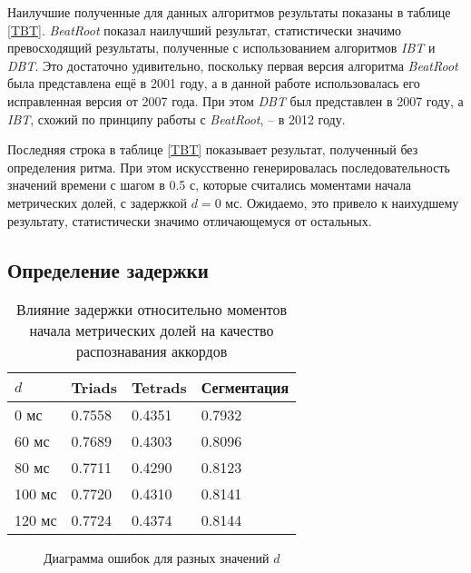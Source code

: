 Наилучшие полученные для данных алгоритмов результаты показаны в таблице
\ref{TBT}. \emph{BeatRoot} показал наилучший результат, статистически значимо
превосходящий результаты, полученные с использованием алгоритмов \emph{IBT} и
\emph{DBT}. Это достаточно удивительно, поскольку первая версия алгоритма
\emph{BeatRoot} была представлена ещё в 2001 году, а в данной работе
использовалась его исправленная версия от 2007 года. При этом \emph{DBT} был
представлен в 2007 году, а \emph{IBT}, схожий по принципу работы с
\emph{BeatRoot}, -- в 2012 году. 

Последняя строка в таблице \ref{TBT} показывает результат, полученный без
определения ритма. При этом искусственно генерировалась последовательность
значений времени с шагом в 0.5 с, которые считались моментами начала метрических
долей, с задержкой $d=0$ мс. Ожидаемо, это привело к наихудшему результату,
статистически значимо отличающемуся от остальных.

\subsection{Определение задержки} \label{ssec3_delay}

\begin{table} [htbp]
  \centering
  \parbox{15cm}{\caption{Влияние задержки относительно моментов начала
  метрических долей на качество распознавания аккордов} \label{TTunFreq}}
  \begin{tabular}{|l|l|l|l|}
  \hline
  $d$ & Triads & Tetrads & Сегментация \\
  \hline
  0 мс & 0.7558 & 0.4351 & 0.7932 \\
  60 мс & 0.7689 & 0.4303 & 0.8096 \\
  80 мс & 0.7711 & 0.4290 & 0.8123 \\
  100 мс & 0.7720 & 0.4310 & 0.8141 \\
  120 мс & 0.7724 & 0.4374 & 0.8144 \\
  \hline
  \end{tabular}
\end{table}

\begin{figure}[h]
  \begin{minipage}[h]{0.49\linewidth}
  \end{minipage}
  \hfill
  \begin{minipage}[h]{0.49\linewidth}
  \end{minipage}
  \hfill
  \begin{minipage}[h]{0.49\linewidth}
  \end{minipage}
  \hfill
  \begin{minipage}[h]{0.49\linewidth}
  \end{minipage}
  \caption{Диаграмма ошибок для разных значений $d$}
  \label{img:offset}
\end{figure}

